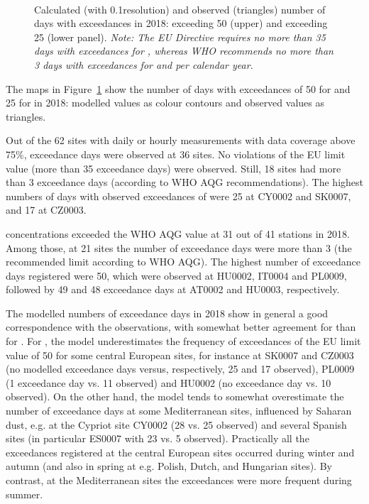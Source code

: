 \begin{figure}[ht]
  \\
  \vspace{0.5cm}
\caption{Calculated (with 0.1\degrees resolution) and observed (triangles) number of days with
  exceedances in 2018: \PM[10] exceeding 50 \ug (upper) and \PM[2.5]
  exceeding 25 \ug (lower panel). \textit{Note: The EU Directive requires no
    more than 35 days with exceedances for \PM[10], whereas WHO
    recommends no more than 3 days with exceedances for \PM[10] and
    \PM[2.5] per calendar year. }}
\label{fig:PMexceed}
\end{figure}


The maps in Figure~\ref{fig:PMexceed} show the number of days with
exceedances of 50 \ug for \PM[10] and 25 \ug for \PM[2.5] in 2018:
modelled values as colour contours and observed values as triangles.

Out of the 62 sites with daily or hourly \PM[10] measurements with data
coverage above 75\%, exceedance days were observed at 36 sites. No
violations of the \PM[10] EU limit value (more than 35 exceedance
days) were observed. Still, 18 sites had more than 3 exceedance days
(according to WHO AQG recommendations). The highest numbers of days
with observed exceedances of \PM[10] were 25 at CY0002 and SK0007, and 17
at CZ0003.

\PM[2.5] concentrations exceeded the WHO AQG value at 31 out of 41
stations in 2018. Among those, at 21 sites the number of exceedance
days were more than 3 (the recommended limit according to WHO AQG). 
The highest number of exceedance days registered were 50, which were observed at HU0002, IT0004 and PL0009, followed by 49 and 48 exceedance days at AT0002 and HU0003, respectively.

The modelled numbers of exceedance days in 2018 show in general a good correspondence with the observations, with somewhat better agreement for \PM[10] than for \PM[2.5]. For \PM[10], the model underestimates the frequency of exceedances of the EU limit value of 50 \ug for some central European sites, for instance at SK0007 and CZ0003 (no modelled exceedance days versus, respectively, 25 and 17 observed), PL0009 (1 exceedance day vs. 11 observed) and HU0002 (no exceedance day vs. 10 observed). On the other hand, the model tends to somewhat overestimate the number of exceedance days at some Mediterranean sites, influenced by Saharan dust, e.g. at the Cypriot site CY0002 (28 vs. 25 observed) and several Spanish sites (in particular ES0007 with 23 vs. 5 observed). Practically all the exceedances registered at the central European sites occurred during winter and autumn (and also in spring at e.g. Polish, Dutch, and Hungarian sites). By contrast, at the Mediterranean sites the exceedances were more frequent during summer.

